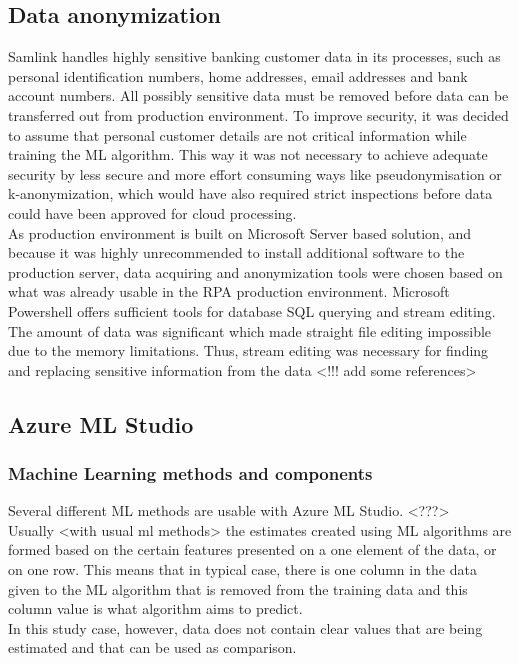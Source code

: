 \documentclass[english, 12pt, a4paper, elec, utf8, a-1b, online]{aaltothesis}
\begin{document}
\subsection{Data anonymization}
Samlink handles highly sensitive banking customer data in its processes,
such as personal identification numbers, home addresses, email addresses and bank account numbers.
All possibly sensitive data must be removed
before data can be transferred out from production environment.
To improve security,
it was decided to assume
that personal customer details are not critical information
while training the ML algorithm.
This way it was not necessary to achieve adequate security
by less secure and more effort consuming ways
like pseudonymisation or k-anonymization,
which would have also required strict inspections
before data could have been approved for cloud processing.
\\
As production environment is built on Microsoft Server based solution,
and because it was highly unrecommended
to install additional software to the production server,
data acquiring and anonymization tools were chosen
based on what was already usable in the RPA production environment.
Microsoft Powershell offers sufficient tools
for database SQL querying
and stream editing.
The amount of data was significant
which made straight file editing impossible
due to the memory limitations.
Thus, stream editing was necessary
for finding and replacing
sensitive information from the data
<!!! add some references>



\subsection{Azure ML Studio}

\subsubsection*{Machine Learning methods and components}
Several different ML methods are usable with Azure ML Studio. <???>
\\
Usually <with usual ml methods> the estimates
created using ML algorithms
are formed based on the certain features
presented on a one element of the data,
or on one row.
This means that in typical case,
there is one column in the data
given to the ML algorithm
that is removed from the training data
and this column value is what algorithm
aims to predict.
\\
In this study case, however,
data does not contain clear values
that are being estimated
and that can be used as comparison.
\end{document}
